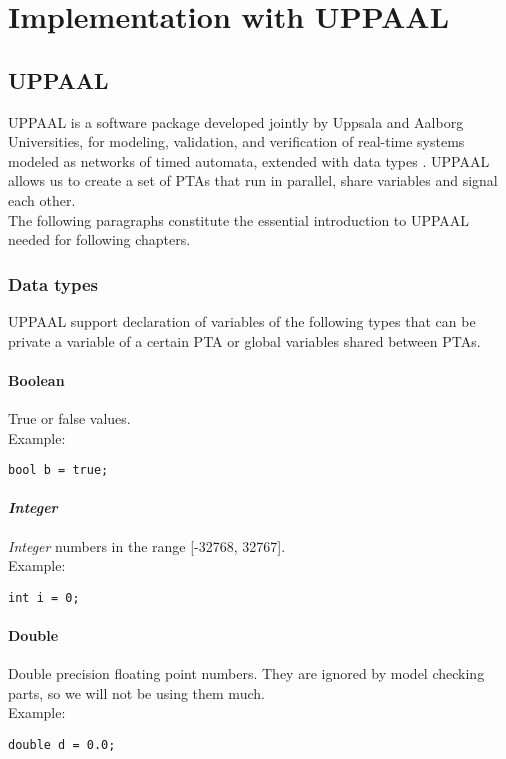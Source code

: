 \chapter{Implementation with UPPAAL}
\section{UPPAAL }
UPPAAL is a software package developed jointly by Uppsala and Aalborg Universities, for modeling, validation, and verification of real-time systems modeled as networks of timed automata, extended with data types \cite{uppaalIntroduction}. UPPAAL allows us to create a set of PTAs that run in parallel, share variables and signal each other. \\
The following paragraphs constitute the essential introduction to UPPAAL needed for following chapters.\\
\subsection{Data types}
UPPAAL support declaration of variables of the following types that can be private a variable of a certain PTA or global variables shared between PTAs.\\
\subsubsection{Boolean}
True or false values.\\
Example:\begin{lstlisting}[style=styleuppaal]
        bool b = true; 
\end{lstlisting}
\subsubsection{\textit{Integer}}
\textit{Integer} numbers in the range [-32768, 32767]. \\
Example:\begin{lstlisting}[style=styleuppaal]
        int i = 0; \end{lstlisting}
\subsubsection{Double}
Double precision floating point numbers. They are ignored by model checking parts, so we will not be using them much.\\
Example:\begin{lstlisting}[style=styleuppaal]
        double d = 0.0; \end{lstlisting}
